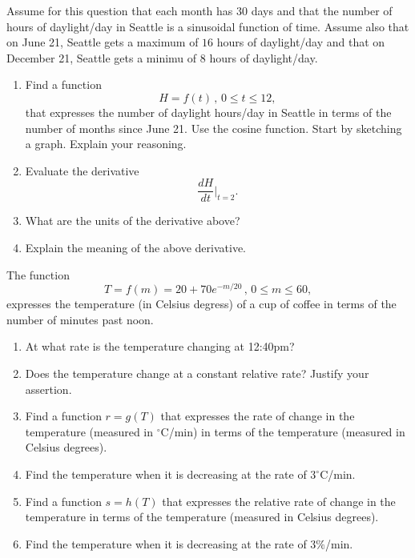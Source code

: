 \documentclass{ximera}
\begin{document}
\begin{question} \label{Q000d9ggdgbgh}
Assume for this question that each month has 30 days and that the number of hours of daylight/day in Seattle is a sinusoidal function of time. Assume also that on June 21, Seattle gets a maximum of $16$ hours of daylight/day and that on December 21, Seattle gets a minimu of $8$ hours of daylight/day.

\begin{enumerate}
\item Find a function 
\[
   H = f(t) \, , \, 0\leq t\leq 12,
\]
that expresses the number of daylight hours/day in Seattle in terms of the number of months since June 21. Use the cosine function. Start by sketching a graph. Explain your reasoning.

\item Evaluate the derivative 
\[
   \frac{dH}{dt}\Big|_{t=2} .
\]

\item What are the units of the derivative above?

\item Explain the meaning of the above derivative.
\end{enumerate}

\end{question}

\begin{question}  \label{Q33eerrggg}
The function
\[
   T = f(m) = 20+70e^{-m/20}\, , \, 0\leq m \leq 60 ,
\]
expresses the temperature (in Celsius degress) of a cup of coffee in terms of the number of minutes past noon.

\begin{enumerate}
\item At what rate is the temperature changing at 12:40pm?

\item Does the temperature change at a constant relative rate? Justify your assertion.

\item Find a function $r=g(T)$ that expresses the rate of change in the temperature (measured in $^\circ$C/min) in terms of the temperature (measured in Celsius degrees).

\item Find the temperature when it is decreasing at the rate of $3^\circ$C/min.

\item Find a function $s=h(T)$ that expresses the relative rate of change in the temperature in terms of the temperature (measured in Celsius degrees).

\item Find the temperature when it is decreasing at the rate of $3\%$/min.
\end{enumerate}
\end{question}
\end{document}
